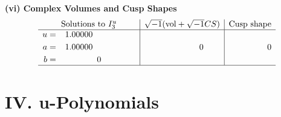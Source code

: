 \documentclass[1p]{elsarticle_modified}
\theoremstyle{definition}
\newcommand{\I}{\sqrt{-1}}
\begin{document}
\newpage\flushleft \textbf{(vi) Complex Volumes and Cusp Shapes}
$$\begin{array}{c|c|c}  
\text{Solutions to }I^u_{3}& \I (\text{vol} + \sqrt{-1}CS) & \text{Cusp shape}\\
 \hline 
\begin{aligned}
u &= \phantom{-}1.00000\phantom{ +0.000000I} \\
a &= \phantom{-}1.00000\phantom{ +0.000000I} \\
b &= \phantom{-0.000000 } 0\end{aligned}
 & \phantom{-0.000000 } 0 & \phantom{-0.000000 } 0\\
 \hline 
 \end{array}$$\newpage
\newpage\renewcommand{\arraystretch}{1}
\centering \section*{ IV. u-Polynomials}
\end{document}
